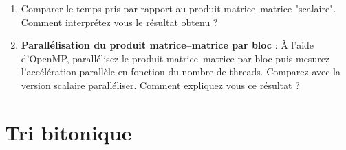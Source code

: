 \documentclass[11pt,a4paper]{article}
\begin{document}
\begin{enumerate}
	L'idée est de décomposer les matrices $A,B$ et $C$ en sous-blocs matriciels :
	\[
	A = \left(
	\begin{array}{cccc}
	A_{11} & A_{12} & \ldots & A_{1N} \\
	A_{21} & \ddots &        & \vdots \\
	\vdots &        & \ddots & \vdots \\
	A_{N1} &        &        & A_{NN}
	\end{array}
	\right),
	B = \left(
	\begin{array}{cccc}
	B_{11} & B_{12} & \ldots & B_{1N} \\
	B_{21} & \ddots &        & \vdots \\
	\vdots &        & \ddots & \vdots \\
	B_{N1} &        &        & B_{NN}
	\end{array}
	\right),
	C = \left(
	\begin{array}{cccc}
	C_{11} & C_{12} & \ldots & C_{1N} \\
	C_{21} & \ddots &        & \vdots \\
	\vdots &        & \ddots & \vdots \\
	C_{N1} &        &        & C_{NN}
	\end{array}
	\right)
	\]

où $A_{IJ},B_{IJ}$ et $C_{IJ}$ sont des sous--blocs possédant une taille fixée ( par le programmeur ).

Le produit matrice--matrice se fait alors par bloc. Pour calculer le bloc $C_{IJ}$, on calcul
\[
C_{IJ} = \sum_{K=1}^{N}A_{IK}.B_{KJ}
\]

Mettre en {\oe}uvre ce produit matrice--matrice en séquentiel puis faire varier la taille des blocs jusqu'à obtenir un optimum.
\item Comparer le temps pris par rapport au produit matrice--matrice "scalaire". Comment interprétez vous le résultat obtenu ?

\item \textbf{\color{blue}Parallélisation du produit matrice--matrice par bloc }: \`A l'aide d'OpenMP, parallélisez le produit matrice--matrice par bloc puis mesurez l'accélération parallèle en fonction du nombre de threads. Comparez avec la version scalaire paralléliser. Comment expliquez vous ce résultat ?
\end{enumerate}

\section{Tri bitonique}
\end{document}
